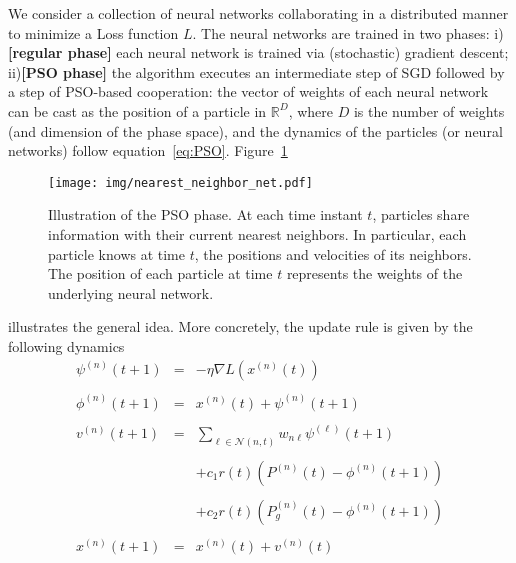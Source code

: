 \documentclass{ieeeaccess}
\begin{document}
We consider a collection of neural networks collaborating in a distributed manner to minimize a Loss function $L$. The neural networks are trained in two phases: i) \textbf{[regular phase]} each neural network is trained via (stochastic) gradient descent; ii)\textbf{[PSO phase]} the algorithm executes an intermediate step of SGD followed by a step of PSO-based cooperation: the vector of weights of each neural network can be cast as the position of a particle in $\mathbb{R}^D$, where $D$ is the number of weights (and dimension of the phase space), and the dynamics of the particles (or neural networks) follow equation~\eqref{eq:PSO}. Figure~\ref{fig:nnn} 
\begin{figure} [hbt]
\begin{center}
\texttt{[image: img/nearest\_neighbor\_net.pdf]}
\caption{Illustration of the PSO phase. At each time instant $t$, particles share information with their current nearest neighbors. In particular, each particle knows at time $t$, the positions and velocities of its neighbors. The position of each particle at time $t$ represents the weights of the underlying neural network.}\label{fig:nnn}
\end{center}
\end{figure}
illustrates the general idea. More concretely, the update rule is given by the following dynamics
\begin{equation}
\begin{array}{ccl}
\psi^{(n)}(t+1) & = & -\eta \nabla L\left(x^{(n)}(t)\right)\\ 
& & \\
\phi^{(n)}(t+1) & = & x^{(n)}(t)+\psi^{(n)}(t+1)\\
& & \\
v^{(n)}(t+1) \!\!\! & \!\!\! = \!\!\! & \!\!\! \sum\limits_{\ell \in \mathcal{N}(n,t)} w_{n\ell} \psi^{(\ell)}(t+1) \\
& & \\
& & + c_1 r(t)\left(P^{(n)}(t)-\phi^{(n)}(t+1)\right) \\
& & \\
& & +c_2 r(t)\left(P_g^{(n)}(t)-\phi^{(n)}(t+1)\right)\\
& & \\
x^{(n)}(t+1) & = & x^{(n)}(t)+v^{(n)}(t)
\end{array} 
\label{eq:f1}
\end{equation}
\end{document}
